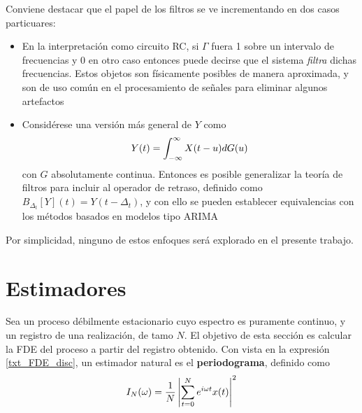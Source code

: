 Conviene destacar que el papel de los filtros se ve incrementando en dos casos particuares:
\begin{itemize}
\item En la interpretación como circuito RC, si $\Gamma$ fuera 1 sobre un intervalo de frecuencias
y 0 en otro caso entonces puede decirse que el sistema \textit{filtra} dichas frecuencias.
%
Estos objetos son físicamente posibles de manera aproximada, y son de uso común 
en el procesamiento de señales para eliminar algunos artefactos
\item Considérese una versión más general de $Y$ como
\begin{equation}
Y(t) = \int_{-\infty}^{\infty} X(t-u) dG(u)
\end{equation}
con $G$ absolutamente continua. Entonces es posible generalizar la teoría de filtros para incluir
al operador de retraso, definido como $B_{\Delta_t}[Y](t) = Y(t-\Delta_t)$, y con ello se pueden
establecer equivalencias con los métodos basados en modelos tipo ARIMA
\end{itemize}
Por simplicidad, ninguno de estos enfoques será explorado en el presente trabajo.


\section{Estimadores}

Sea \xt un proceso débilmente estacionario cuyo espectro es puramente continuo, y \xtd un registro 
de una realización, de tamo $N$. 
%
El objetivo de esta sección es calcular la FDE del proceso a partir del registro obtenido.
%
Con vista en la expresión \ref{txt_FDE_disc}, un estimador natural es el \textbf{periodograma}, 
definido como
\begin{equation}
I_N(\omega) = \frac{1}{N} \left| \sum_{t = 0}^{N} e^{i \omega t} x(t) \right|^{2}
\label{txt_periodograma}
\end{equation}



